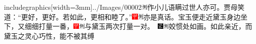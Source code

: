 {includegraphics[width=3mm]{../Images/00002}\includegraphics[width=3mm]{../Images/00011}\footnotesize \kaishu 作小儿语瞒过世人亦可。}贾母笑道：“更好，更好。若如此，更相和睦了。”{\includegraphics[width=3mm]{../Images/00002}\includegraphics[width=3mm]{../Images/00011}\footnotesize \kaishu 亦是真话。}宝玉便走近黛玉身边坐下，又细细打量一番，{{\includegraphics[width=3mm]{../Images/00002}\includegraphics[width=3mm]{../Images/00011}\footnotesize \kaishu 与黛玉两次打量一对。　}\includegraphics[width=3mm]{../Images/00006}\includegraphics[width=3mm]{../Images/00011}\footnotesize \kaishu 姣惯处如画。如此亲近，而黛玉之灵心巧性，能不被其缚}

